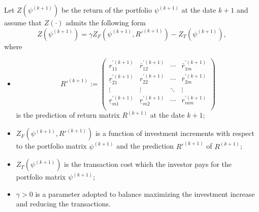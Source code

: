 \documentclass[11pt]{article}
\numberwithin{equation}{section}
\begin{document}
Let $Z(\psi^{(k+1)})$ be the return of the portfolio $\psi^{(k+1)}$ at the date $k+1$ and assume that $Z(\cdot)$ admits the following form 
\begin{equation} \label{profit}
Z(\psi^{(k+1)})=\gamma Z_F(\psi^{(k+1)},R'^{(k+1)})-Z_T(\psi^{(k+1)}) , 
\end{equation}
where  
\begin{itemize}
\item \begin{equation}
R'^{(k+1)}:= \left(\begin{array}{ccccc}
	r_{11}^{'(k+1)} & \bar r_{12}^{'(k+1)}& \cdots&\bar r_{1m}^{'(k+1)}\\
	\underline r_{21}^{'(k+1)} & r_{22}^{'(k+1)}& \cdots&\bar r_{2m}^{'(k+1)}\\
	\vdots & \vdots& \ddots&\vdots\\
	\underline r_{m1}^{'(k+1)} &\underline  r_{m2}^{'(k+1)}&\cdots&r_{mm}^{'(k+1)}\\
	\end{array}
	\right)
	\end{equation}is the prediction of return matrix $R^{(k+1)}$ at the date $k+1;$

\item $ Z_F(\psi^{(k+1)},R'^{(k+1)})$ is a function of  investment increments with respect to the portfolio matrix  $\psi^{(k+1)} $ and the prediction $R'^{(k+1)}$ of $R^{(k+1)}$; 

\item $ Z_T(\psi^{(k+1)} )$ is the transaction cost which the  investor  pays  for the portfolio matrix $\psi^{(k+1)} $;

\item $\gamma>0$ is a parameter adopted to balance maximizing the investment increase and reducing the transactions. 
\end{itemize}
\end{document}
